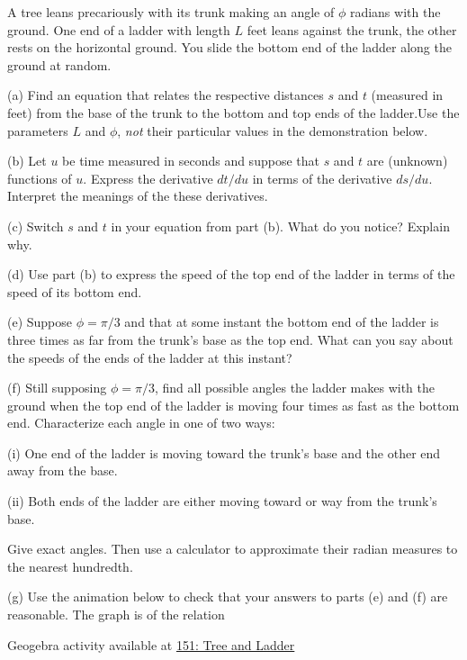 \documentclass{ximera}
\begin{document}
\begin{question}  \label{QMMnd6793}
A tree leans precariously with its trunk making an angle of $\phi$ radians with the ground. One end of a ladder with length $L$ feet leans against the trunk, the other rests on the horizontal ground. You slide the bottom end of the ladder along the ground at random.

(a) Find an equation that relates the respective distances $s$ and $t$ (measured in feet) from the base of the trunk to the bottom and top ends of the ladder.Use the parameters $L$ and $\phi$, \emph{not} their particular values in the demonstration below.

(b) Let $u$ be time measured in seconds and suppose that $s$ and $t$ are (unknown) functions of $u$. Express the derivative $dt/du$ in terms of the derivative $ds/du$. Interpret the meanings of the these derivatives.

(c) Switch $s$ and $t$ in your equation from part (b). What do you notice? Explain why.

(d) Use part (b) to express the speed of the top end of the ladder in terms of the speed of its bottom end.

(e) Suppose $\phi=\pi/3$ and that at some instant the bottom end of the ladder is three times as far from the trunk's base as the top end. What can you say about the speeds of the ends of the ladder at this instant? 

(f) Still supposing $\phi=\pi/3$, find all possible angles the ladder makes with the ground when the top end of the ladder is moving four times as fast as the bottom end. Characterize each angle in one of two ways:

(i) One end of the ladder is moving toward the trunk's base and the other end away from the base.

(ii) Both ends of the ladder are either moving toward or way from the trunk's base.

Give exact angles. Then use a calculator to approximate their radian measures to the nearest hundredth.

(g) Use the animation below to check that your answers to parts (e) and (f) are reasonable. The graph is of the relation


\begin{onlineOnly}
    \begin{center}
\end{center}
\end{onlineOnly}

Geogebra activity available at \href{https://www.desmos.com/calculator/58jqjo0inl}{151: Tree and Ladder}

\end{question}
\end{document}
